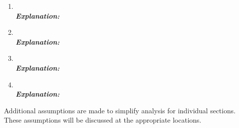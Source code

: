 \documentclass[12pt]{article}  %
\begin{document}
\begin{enumerate}

	\item \textbf{}\\
	\textbf{\textit{Explanation:}}
	
	
		\item \textbf{}\\
	
		\textbf{\textit{Explanation:}}
		
		
			\item \textbf{}\\
			
			\textbf{\textit{Explanation:}}
			
			
				\item \textbf{}\\
				
				\textbf{\textit{Explanation:}}
\end{enumerate}
Additional assumptions are made to simplify analysis for individual sections. These assumptions will be discussed at the appropriate locations.
\end{document}
